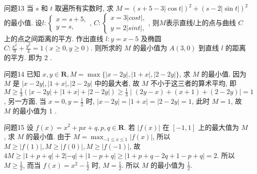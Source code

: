 问题13 当 $s$ 和 $t$ 取遍所有实数时, 求 $M=(s+5-3|\cos t|)^2+(s-2|\sin t|)^2$ 的最小值.
设$l:\left\{\begin{array}{l}x=s+5,\\y=s,\end{array}\right.$, $C:\left\{\begin{array}{l}x=3|cos t|,\\y=2|sin t|,\end{array}\right.$, 则$M$表示直线$l$上的点与曲线 $C$ 上的点之间距离的平方.
作出直线 $l: y=x-5$ 及椭圆 $C: \frac{x^2}{9}+\frac{y^2}{4}=1 (x \geqslant 0, y \geqslant 0)$. 则所求的 $M$ 的最小值为 $A(3,0)$ 到直线 $l$ 的距离的平方.
即为 2 .



问题14 已知 $x, y \in \mathbf{R}, M=\max \{|x-2 y|,|1+x|,|2-2 y|\}$, 求 $M$ 的最小值.
因为 $M$ 是 $|x-2 y|,|1+x|,|2-2 y|$ 中的最大者, 故 $M$ 不小于这三者的算术平均, 即 $M \geqslant \frac{1}{3}(|x-2 y|+|1+x|+|2-2 y|) \geqslant \frac{1}{3} \mid(2 y-x)+ (x+1)+(2-2 y) \mid=1$, 另一方面, 当 $x=0, y=\frac{1}{2}$ 时, $|x-2 y|=\mid 1+ x|=| 2-2 y \mid=1$, 此时 $M=1$, 故 $M$ 的最小值为 1 .



问题15 设 $f(x)=x^2+p x+q, p, q \in \mathbf{R}$. 若 $|f(x)|$ 在 $[-1,1]$ 上的最大值为 $M$, 求 $M$ 的最小值.
由于 $M=\max _{-1 \leqslant x \leqslant 1}|f(x)|$, 所以 $M \geqslant|f(1)|, M \geqslant|f(0)|, M \geqslant |f(-1)|$, 故 $4 M \geqslant|1+p+q|+2|-q|+|1-p+q| \geqslant \mid 1+p+q- 2 q+1-p+q \mid=2$. 所以 $M \geqslant \frac{1}{2}$, 而当 $f(x)=x^2-\frac{1}{2}$ 时, $M=\frac{1}{2}$. 所以 $M$ 的最小值为 $\frac{1}{2}$.



